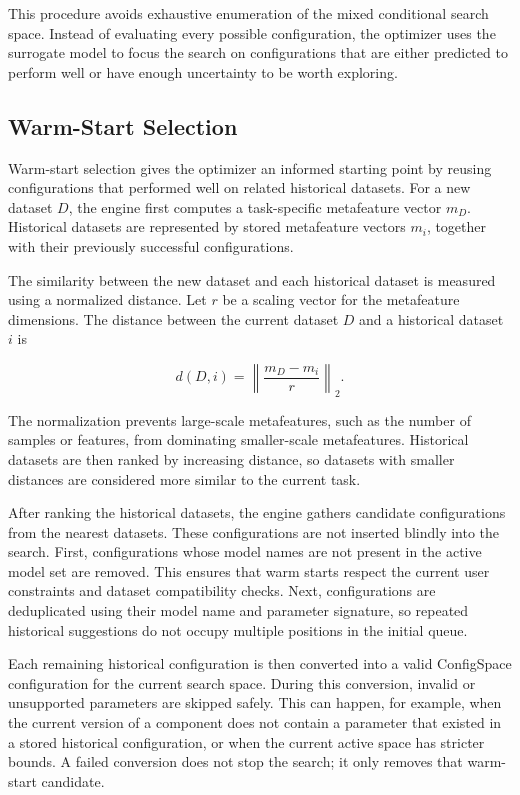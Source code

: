 \documentclass[12pt,a4paper,oneside]{report}
\begin{document}
\noindent This procedure avoids exhaustive enumeration of the mixed conditional search
space. Instead of evaluating every possible configuration, the optimizer uses the
surrogate model to focus the search on configurations that are either predicted
to perform well or have enough uncertainty to be worth exploring.

\subsection{Warm-Start Selection}

Warm-start selection gives the optimizer an informed starting point by reusing
configurations that performed well on related historical datasets. For a new
dataset \(D\), the engine first computes a task-specific metafeature vector
\(m_D\). Historical datasets are represented by stored metafeature vectors
\(m_i\), together with their previously successful configurations.

\noindent The similarity between the new dataset and each historical dataset is measured
using a normalized distance. Let \(r\) be a scaling vector for the metafeature
dimensions. The distance between the current dataset \(D\) and a historical
dataset \(i\) is

\[
d(D,i) =
\left\|
\frac{m_D - m_i}{r}
\right\|_2 .
\]

\noindent The normalization prevents large-scale metafeatures, such as the number of
samples or features, from dominating smaller-scale metafeatures. Historical
datasets are then ranked by increasing distance, so datasets with smaller
distances are considered more similar to the current task.

\noindent After ranking the historical datasets, the engine gathers candidate
configurations from the nearest datasets. These configurations are not inserted
blindly into the search. First, configurations whose model names are not present
in the active model set are removed. This ensures that warm starts respect the
current user constraints and dataset compatibility checks. Next, configurations
are deduplicated using their model name and parameter signature, so repeated
historical suggestions do not occupy multiple positions in the initial queue.

\noindent Each remaining historical configuration is then converted into a valid
ConfigSpace configuration for the current search space. During this conversion,
invalid or unsupported parameters are skipped safely. This can happen, for
example, when the current version of a component does not contain a parameter
that existed in a stored historical configuration, or when the current active
space has stricter bounds. A failed conversion does not stop the search; it only
removes that warm-start candidate.
\end{document}
